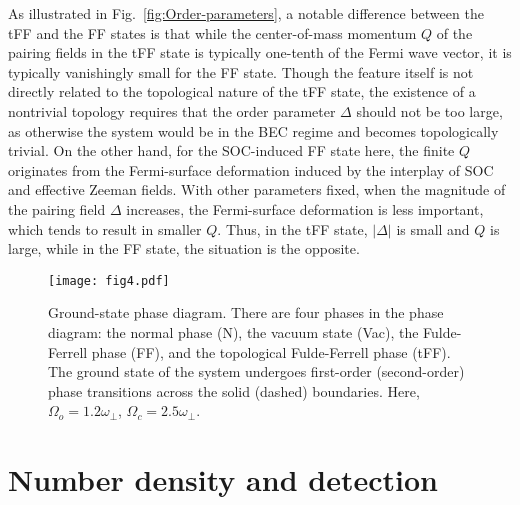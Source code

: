 \documentclass[a4paper, aps,pra, twocolumn, superscriptaddress, showpacs]{revtex4}
\begin{document}
As illustrated in Fig.~\ref{fig:Order-parameters}, a notable difference between the tFF and the FF states is that while the center-of-mass momentum $Q$ of the pairing fields in the tFF state is typically one-tenth of the Fermi wave vector, it is typically vanishingly small for the FF state. Though the feature itself is not directly related to the topological nature of the tFF state, the existence of a nontrivial topology requires that the order parameter $\Delta$ should not be too large, as otherwise the system would be in the BEC regime and becomes topologically trivial. On the other hand, for the SOC-induced FF state here, the finite $Q$ originates from the Fermi-surface deformation induced by the interplay of SOC and effective Zeeman fields. With other parameters fixed, when the magnitude of the pairing field $\Delta$ increases, the Fermi-surface deformation is less important, which tends to result in smaller $Q$. Thus, in the tFF state, $|\Delta|$ is small and $Q$ is large, while in the FF state, the situation is the opposite.




\begin{figure}[tbp]
\texttt{[image: fig4.pdf]}
\caption{\label{fig:Phase-diagrams}Ground-state phase diagram. There are four phases in
the phase diagram: the normal phase (N), the vacuum state (Vac),
the Fulde-Ferrell phase (FF), and the topological Fulde-Ferrell phase
(tFF). The ground state of the system undergoes first-order (second-order) phase transitions across the solid (dashed) boundaries. Here, $\Omega_{o}=1.2\omega_{\perp}$, $\Omega_{c}=2.5\omega_{\perp}$.}
\end{figure}


\section{Number density and detection}
\end{document}
